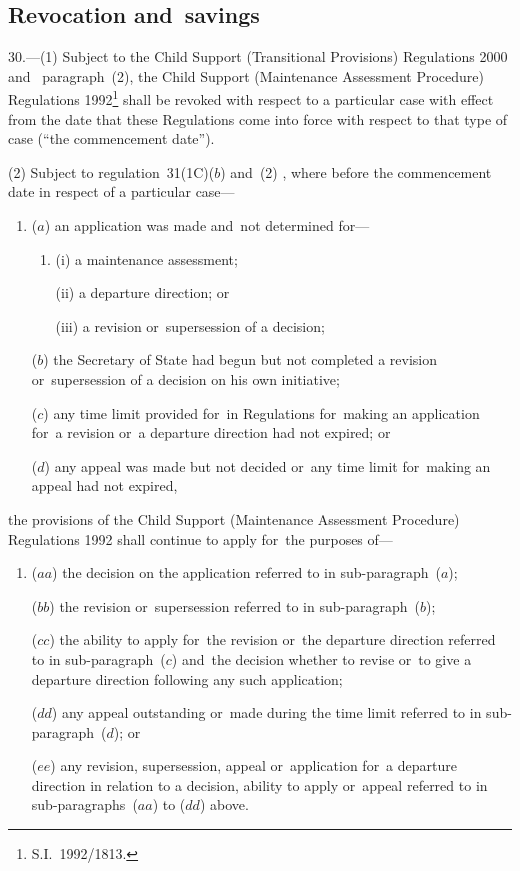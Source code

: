 \documentclass[12pt,a4paper]{article}
\begin{document}
\subsection[30. Revocation and~savings]{Revocation and~savings}

30.---(1)  Subject to 
the Child Support (Transitional Provisions) Regulations 2000 and~%
paragraph~(2), the Child Support (Maintenance Assessment Procedure) Regulations 1992\footnote{S.I.~1992/1813.} shall be revoked with respect to a particular case with effect from the date that these Regulations come into force with respect to that type of case (“the commencement date”).

(2) Subject to 
regulation~31(1C)($b$)  and~(2)%
, where before the commencement date in respect of a particular case—
\begin{enumerate}\item[]
($a$) an application was made and~not determined for—
\begin{enumerate}\item[]
(i) a maintenance assessment;

(ii) a departure direction; or

(iii) a revision or~supersession of a decision;
\end{enumerate}

($b$) the Secretary of State had begun but not completed a revision or~supersession of a decision on his own initiative;

($c$) any time limit provided for~in Regulations for~making an application for~a revision or~a departure direction had not expired; or

($d$) any appeal was made but not decided or~any time limit for~making an appeal had not expired,
\end{enumerate}
the provisions of the Child Support (Maintenance Assessment Procedure) Regulations 1992 shall continue to apply for~the purposes of—
\begin{enumerate}\item[]
($aa$) the decision on the application referred to in sub-paragraph~($a$);

($bb$) the revision or~supersession referred to in sub-paragraph~($b$);

($cc$) the ability to apply for~the revision or~the departure direction referred to in sub-paragraph~($c$)  and~the decision whether to revise or~to give a departure direction following any such application;

($dd$) any appeal outstanding or~made during the time limit referred to in sub-paragraph~($d$); or

($ee$) any revision, supersession, appeal or~application for~a departure direction in relation to a decision, ability to apply or~appeal referred to in sub-paragraphs~($aa$)  to ($dd$)  above.
\end{enumerate}
\end{document}
